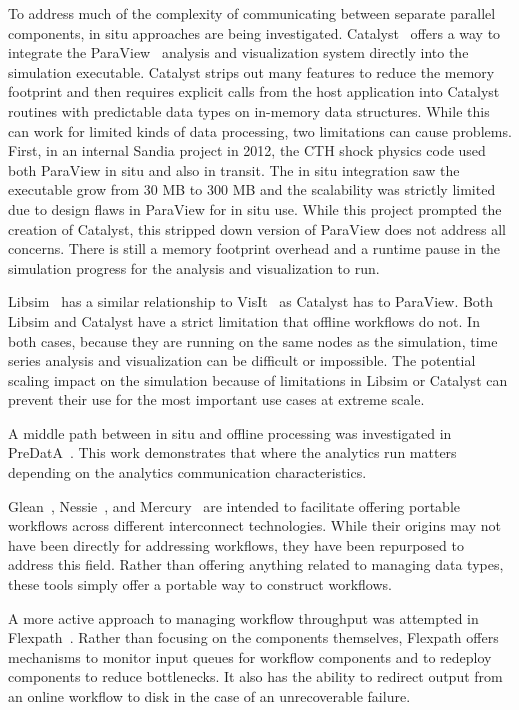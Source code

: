 \documentclass[conference]{IEEEtran}
\begin{document}
To address much of the complexity of communicating between separate parallel
components, in situ approaches are being investigated.
Catalyst~\cite{karimabadi:2013:catalyst} offers a way to integrate the
ParaView~\cite{Moreland:2008:paraview} analysis and visualization system
directly into the simulation executable. Catalyst strips out many features to
reduce the memory footprint and then requires explicit calls from the host
application into Catalyst routines with predictable data types on in-memory
data structures. While this can work for limited kinds of data processing, two
limitations can cause problems. First, in an internal Sandia project in 2012,
the CTH shock physics code used both ParaView in situ and also in transit. The
in situ integration saw the executable grow from 30 MB to 300 MB and the
scalability was strictly limited due to design flaws in ParaView for in situ
use. While this project prompted the creation of Catalyst, this stripped down
version of ParaView does not address all concerns. There is still a memory
footprint overhead and a runtime pause in the simulation progress for the
analysis and visualization to run.

Libsim~\cite{whitlock:2011:libsim} has a similar relationship to
VisIt~\cite{Riedel:2007:visit} as Catalyst has to ParaView. Both Libsim and
Catalyst have a strict limitation that offline workflows do not. In both cases,
because they are running on the same nodes as the simulation, time series
analysis and visualization can be difficult or impossible. The potential
scaling impact on the simulation because of limitations in Libsim or Catalyst
can prevent their use for the most important use cases at extreme scale.

A middle path between in situ and offline processing was investigated in PreDatA~\cite{zheng:2010:predata}. This work demonstrates that where the analytics run matters depending on the analytics communication characteristics.

Glean~\cite{vishwanath:2011:glean}, Nessie~\cite{oldfield:lwfs-data-movement},
and Mercury~\cite{Soumagne:2013:mercury} are intended to facilitate offering
portable workflows across different interconnect technologies. While their
origins may not have been directly for addressing workflows, they have been
repurposed to address this field. Rather than offering anything related to
managing data types, these tools simply offer a portable way to construct
workflows.

A more active approach to managing workflow throughput was attempted in
Flexpath~\cite{Dayal:2014:flexpath}. Rather than focusing on the components
themselves, Flexpath offers mechanisms to monitor input queues for workflow
components and to redeploy components to reduce bottlenecks. It also has the
ability to redirect output from an online workflow to disk in the case of an
unrecoverable failure.
\end{document}

